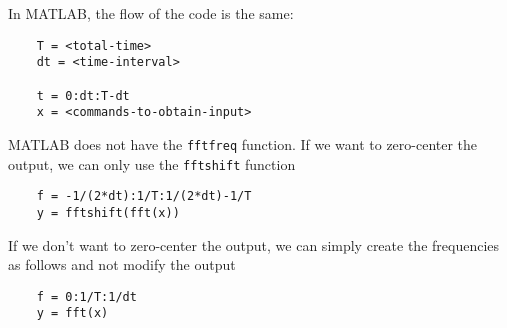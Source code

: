 \documentclass{article}
\begin{document}
In MATLAB, the flow of the code is the same:
\begin{verbatim}
    T = <total-time>
    dt = <time-interval>

    t = 0:dt:T-dt
    x = <commands-to-obtain-input>
\end{verbatim}

MATLAB does not have the {\tt fftfreq} function. If we want to zero-center the output, we can only use
the {\tt fftshift} function
\begin{verbatim}
    f = -1/(2*dt):1/T:1/(2*dt)-1/T
    y = fftshift(fft(x))
\end{verbatim}

If we don't want to zero-center the output, we can simply create the frequencies as follows and not modify
the output
\begin{verbatim}
    f = 0:1/T:1/dt
    y = fft(x)
\end{verbatim}
\end{document}
